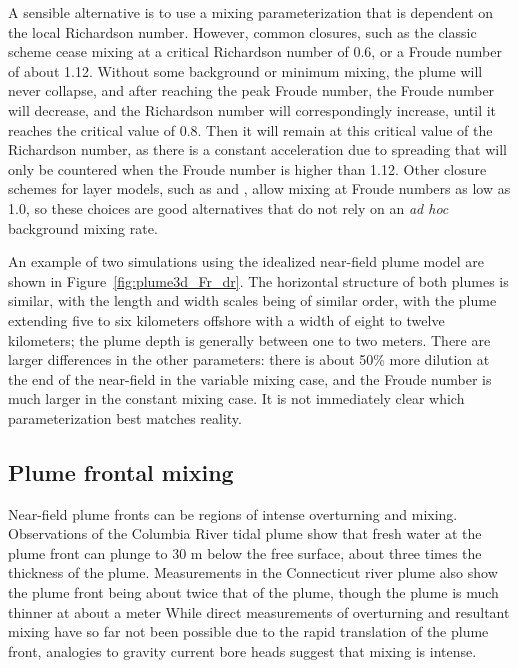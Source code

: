 \documentclass[12pt]{article}
\begin{document}
{A sensible alternative is to use a mixing parameterization that is dependent on the local Richardson number. However, common closures, such as the classic \citet{ellison.turner:59} scheme cease mixing at a critical Richardson number of 0.6, or a Froude number of about 1.12. Without some background or minimum mixing, the plume will never collapse, and after reaching the peak Froude number, the Froude number will decrease, and the Richardson number will correspondingly increase, until it reaches the critical value of 0.8. Then it will remain at this critical value of the Richardson number, as there is a constant acceleration due to spreading that will only be countered when the Froude number is higher than 1.12. Other closure schemes for layer models, such as \citet{christodoulou:86} and \citet{cenedese.adduce:08}, allow mixing at Froude numbers as low as 1.0, so these choices are good alternatives that do not rely on an {\it ad hoc} background mixing rate. 

An example of two simulations using the idealized near-field plume model are shown in Figure~\ref{fig:plume3d_Fr_dr}. The horizontal structure of both plumes is similar, with the length and width scales being of similar order, with the plume extending five to six kilometers offshore with a width of eight to twelve kilometers; the plume depth is generally between one to two meters. There are larger differences in the other parameters: there is about 50\% more dilution at the end of the near-field in the variable mixing case, and the Froude number is much larger in the constant mixing case. It is not immediately clear which parameterization best matches reality.


\subsection{Plume frontal mixing}

Near-field plume fronts can be regions of intense overturning and mixing. Observations of the Columbia River tidal plume show that fresh water at the plume front can plunge to 30 m below the free surface, about three times the thickness of the plume. Measurements in the Connecticut river plume also show the plume front being about twice that of the plume, though the plume is much thinner at about a meter \citep{odonnell.ea:98} While direct measurements of overturning and resultant mixing have so far not been possible due to the rapid translation of the plume front, analogies to gravity current bore heads suggest that mixing is intense.

}
\end{document}
